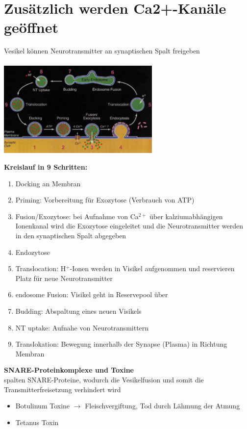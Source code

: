 \documentclass[12pt,a4paper]{article}
\begin{document}
\section{Zusätzlich werden Ca2+-Kanäle geöffnet}
Vesikel können Neurotransmitter an synaptischen Spalt freigeben\\\\
\includegraphics[width=0.6\textwidth]{tmp_pix/vesikel.png}

\textbf{Kreislauf in 9 Schritten:}
\begin{enumerate}
	\item Docking an Membran
	\item Priming: Vorbereitung für Exozytose (Verbrauch von ATP)
	\item Fusion/Exozytose: bei Aufnahme von Ca$^{2+}$ über kalziumabhängigen Ionenkanal wird die Exozytose eingeleitet und die Neurotransmitter werden in den synaptischen Spalt abgegeben
	\item Endozytose
	\item Translocation: H$^+$-Ionen werden in Visikel aufgenommen und reservieren Platz für neue Neurotransmitter
	\item endosome Fusion: Visikel geht in Reservepool über
	\item Budding: Abspaltung eines neuen Visikels
	\item NT uptake: Aufnahe von Neurotransmittern
	\item Translokation: Bewegung innerhalb der Synapse (Plasma) in Richtung Membran
\end{enumerate}

\textbf{SNARE-Proteinkomplexe und Toxine}\\
spalten SNARE-Proteine, wodurch die Vesikelfusion und somit die
Transmitterfreisetzung verhindert wird
\begin{itemize}
	\item Botulinum Toxine $\rightarrow$ Fleischvergiftung, Tod durch Lähmung der Atmung
	\item Tetanus Toxin
\end{itemize}
\end{document}
